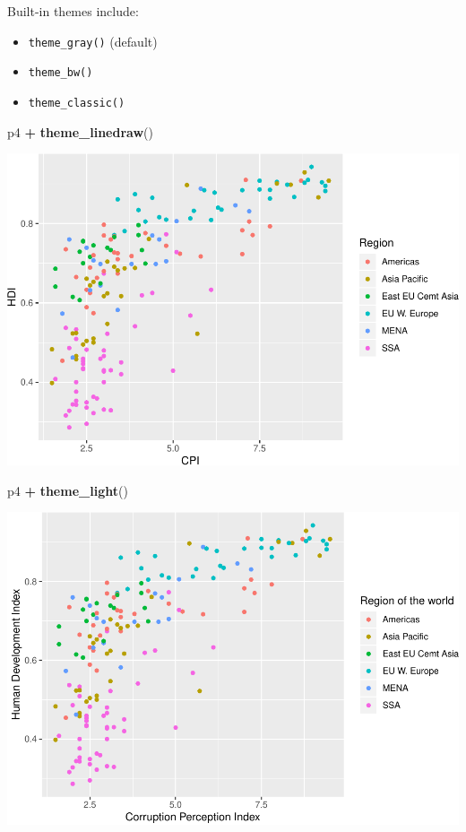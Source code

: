 \documentclass[
]{book}
\newenvironment{Shaded}{\begin{snugshade}}{\end{snugshade}}
\newcommand{\KeywordTok}[1]{\textcolor[rgb]{0.13,0.29,0.53}{\textbf{#1}}}
\newcommand{\NormalTok}[1]{#1}
\newcommand{\OperatorTok}[1]{\textcolor[rgb]{0.81,0.36,0.00}{\textbf{#1}}}
\newcommand{\StringTok}[1]{\textcolor[rgb]{0.31,0.60,0.02}{#1}}
\providecommand{\tightlist}{%
  \setlength{\itemsep}{0pt}\setlength{\parskip}{0pt}}
\begin{document}
Built-in themes include:

\begin{itemize}
\tightlist
\item
  \texttt{theme\_gray()} (default)
\item
  \texttt{theme\_bw()}
\item
  \texttt{theme\_classic()}
\end{itemize}

\begin{Shaded}
\begin{Highlighting}[]
\NormalTok{p4 }\OperatorTok{+}\StringTok{ }\KeywordTok{theme\_linedraw}\NormalTok{()}
\end{Highlighting}
\end{Shaded}

\includegraphics{R/Rgraphics/figures/unnamed-chunk-207-1.pdf}

\begin{Shaded}
\begin{Highlighting}[]
\NormalTok{p4 }\OperatorTok{+}\StringTok{ }\KeywordTok{theme\_light}\NormalTok{()}
\end{Highlighting}
\end{Shaded}

\includegraphics{R/Rgraphics/figures/unnamed-chunk-208-1.pdf}
\end{document}
